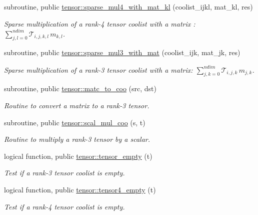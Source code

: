 \begin{DoxyCompactItemize}
subroutine, public \hyperlink{namespacetensor_af65ad5ae657ecd97f70109b2c273696b}{tensor\+::sparse\+\_\+mul4\+\_\+with\+\_\+mat\+\_\+kl} (coolist\+\_\+ijkl, mat\+\_\+kl, res)
\begin{DoxyCompactList}\small\item\em Sparse multiplication of a rank-\/4 tensor coolist with a matrix \+: ${\displaystyle \sum_{j,l=0}^{ndim}} \mathcal{T}_{i,j,k,l} \, m_{k,l} $. \end{DoxyCompactList}\item 
subroutine, public \hyperlink{namespacetensor_a33bc74f9042478d58240b1a1a91db91d}{tensor\+::sparse\+\_\+mul3\+\_\+with\+\_\+mat} (coolist\+\_\+ijk, mat\+\_\+jk, res)
\begin{DoxyCompactList}\small\item\em Sparse multiplication of a rank-\/3 tensor coolist with a matrix\+: ${\displaystyle \sum_{j,k=0}^{ndim}} \mathcal{T}_{i,j,k} \, m_{j,k}$. \end{DoxyCompactList}\item 
subroutine, public \hyperlink{namespacetensor_ad868662d382dc1579db6847f2411c382}{tensor\+::matc\+\_\+to\+\_\+coo} (src, dst)
\begin{DoxyCompactList}\small\item\em Routine to convert a matrix to a rank-\/3 tensor. \end{DoxyCompactList}\item 
subroutine, public \hyperlink{namespacetensor_af105ec6083969c52f5e7422d75a5cda5}{tensor\+::scal\+\_\+mul\+\_\+coo} (s, t)
\begin{DoxyCompactList}\small\item\em Routine to multiply a rank-\/3 tensor by a scalar. \end{DoxyCompactList}\item 
logical function, public \hyperlink{namespacetensor_ab08af814baeb0b670bd5d587ca578239}{tensor\+::tensor\+\_\+empty} (t)
\begin{DoxyCompactList}\small\item\em Test if a rank-\/3 tensor coolist is empty. \end{DoxyCompactList}\item 
logical function, public \hyperlink{namespacetensor_a9b00b4f3cebb865971bcbaf818602ddc}{tensor\+::tensor4\+\_\+empty} (t)
\begin{DoxyCompactList}\small\item\em Test if a rank-\/4 tensor coolist is empty. \end{DoxyCompactList}\item 

\end{DoxyCompactItemize}

